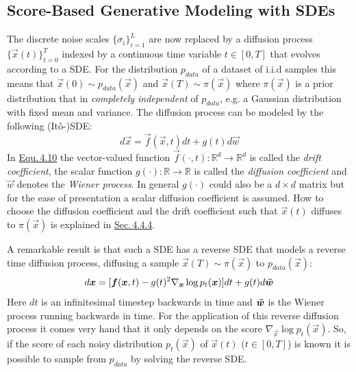 \subsection{Score-Based Generative Modeling with SDEs} \label{sec:4.4.1}
The discrete noise scales $\{\sigma_i\}_{i=1}^L$ are now replaced by a diffusion process $\{\vec{x}(t)\}_{t=0}^T$ indexed by a continuous time variable $t\in[0,T]$ that evolves according to a SDE. For the distribution $p_{data}$ of a dataset of i.i.d samples this means that $\vec{x}(0)\sim p_{data}(\vec{x})$ and $\vec{x}(T)\sim \pi(\vec{x})$ where $\pi(\vec{x})$ is a prior distribution that in \textit{completely independent} of $p_{data}$, e.g. a Gaussian distribution with fixed mean and variance. The diffusion process can be modeled by the following (Itô-)SDE:
%
\begin{equation} \label{equ:4.10}
    d\vec{x}=\vec{f}(\vec{x},t)dt+g(t)d\vec{w}
\end{equation}
%
In \hyperref[equ:4.10]{Equ.\,4.10} the vector-valued function $\vec{f}(\cdot,t):\mathbb{R}^d\rightarrow\mathbb{R}^d$ is called the \textit{drift coefficient}, the scalar function $g(\cdot):\mathbb{R}\rightarrow\mathbb{R}$ is called the \textit{diffusion coefficient} and $\vec{w}$ denotes the \textit{Wiener process}. In general $g(\cdot)$ could also be a $d\times d$ matrix but for the ease of presentation a scalar diffusion coefficient is assumed. How to choose the diffusion coefficient and the drift coefficient such that $\vec{x}(t)$ diffuses to $\pi(\vec{x})$ is explained in \hyperref[sec:4.4.4]{Sec.\,4.4.4}.

A remarkable result \cite{ANDERSON} is that such a SDE has a reverse SDE that models a reverse time diffusion process, diffusing a sample $\vec{x}(T)\sim\pi(\vec{x})$ to $p_{data}(\vec{x})$:
%
\begin{equation} \label{equ:4.11}
    d\vec{x}=[\vec{f}(\vec{x},t)-g(t)^2\nabla_{\vec{x}}\log p_t(\vec{x})]dt+g(t)d\vec{\Bar{w}}
\end{equation}
%
Here $dt$ is an infinitesimal timestep backwards in time and $\vec{\Bar{w}}$ is the Wiener process running backwards in time. For the application of this reverse diffusion process it comes very hand that it only depends on the score $\nabla_{\vec{x}}\log p_t(\vec{x})$. So, if the score of each noisy distribution $p_t(\vec{x})$ of $\vec{x}(t)$ ($t\in[0, T]$) is known it is possible to sample from $p_{data}$ by solving the reverse SDE.
%
